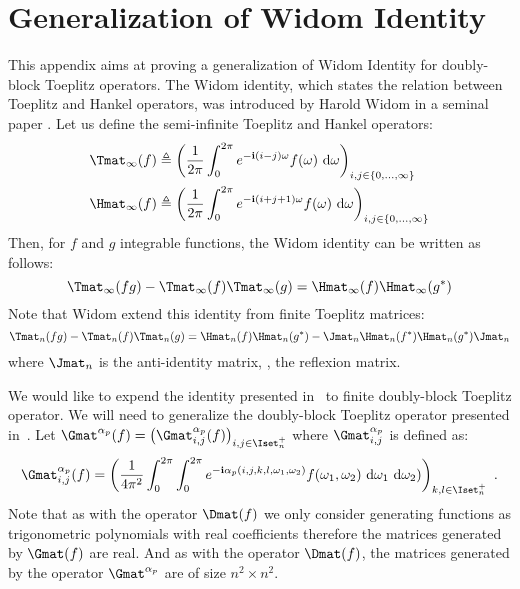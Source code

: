 \chapter{Generalization of Widom Identity}
\label{appendix:ap1-proof_of_the_generalization_of_widom_identity}

This appendix aims at proving a generalization of Widom Identity for doubly-block Toeplitz operators.
The Widom identity, which states the relation between Toeplitz and Hankel operators, was introduced by Harold Widom in a \citeyear{widom1976asymptotic} seminal paper \cite{widom1976asymptotic}.
Let us define the semi-infinite Toeplitz and Hankel operators:
\begin{align}
  \Tmat_\infty(f) &\triangleq \leftmat\frac{1}{2\pi} \int_{0}^{2\pi} e^{-\ci(i-j)\omega}f(\omega) \,\diff \omega\rightmat_{i,j \in \{0, \dots, \infty\}} \\
  \Hmat_\infty(f) &\triangleq \leftmat\frac{1}{2\pi} \int_{0}^{2\pi} e^{-\ci(i+j+1)\omega}f(\omega) \,\diff \omega\rightmat_{i,j \in \{0, \dots, \infty\}}
\end{align}
Then, for $f$ and $g$ integrable functions, the Widom identity can be written as follows:
\begin{equation}
  \Tmat_\infty(fg) - \Tmat_\infty(f) \Tmat_\infty(g) = \Hmat_\infty(f) \Hmat_\infty(g^*)
\end{equation}
Note that Widom extend this identity from finite Toeplitz matrices:
\begin{equation} \label{equation:ap1-widom_identity}
  \Tmat_n(fg) - \Tmat_n(f) \Tmat_n(g) = \Hmat_n(f) \Hmat_n(g^*) - \Jmat_n \Hmat_n(f^*) \Hmat_n(g^*) \Jmat_n
\end{equation}
where $\Jmat_n$ is the anti-identity matrix, \ie, the reflexion matrix.

We would like to expend the identity presented in~ to finite doubly-block Toeplitz operator.
We will need to generalize the doubly-block Toeplitz operator presented in~.
Let $\Gmat^{\alpha_p} (f) = \leftmat \Gmat^{\alpha_p}_{i,j}(f) \rightmat_{i,j \in \Iset^+_n}$ where $\Gmat^{\alpha_p}_{i,j}$ is defined as:
\begin{equation}
  \Gmat^{\alpha_p}_{i,j}(f) =\leftmat \frac{1}{4\pi^{2}} \int_{0}^{2\pi} \int_{0}^{2\pi} e^{-\ci \alpha_p(i, j, k, l, \omega_1, \omega_2)}  f(\omega_{1},\omega_{2}) \,\diff \omega_{1} \,\diff \omega_{2})
  \rightmat_{k,l \in \Iset^+_n} \enspace.
\end{equation}
Note that as with the operator $\Dmat(f)$ we only consider generating functions as trigonometric polynomials with real coefficients therefore the matrices generated by $\Gmat(f)$ are real. 
And as with the operator $\Dmat(f)$, the matrices generated by the operator $\Gmat^{\alpha_p}$ are of size $n^2 \times n^2$. 

